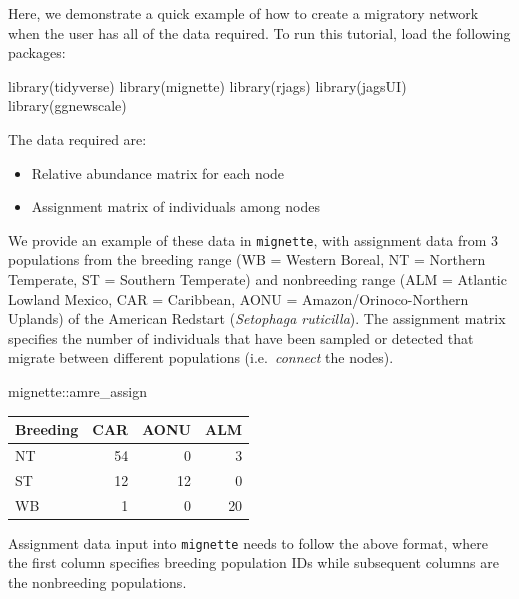 \documentclass[
]{book}
\newenvironment{Shaded}{\begin{snugshade}}{\end{snugshade}}
\newcommand{\FunctionTok}[1]{\textcolor[rgb]{0.00,0.00,0.00}{#1}}
\newcommand{\NormalTok}[1]{#1}
\newcommand{\SpecialCharTok}[1]{\textcolor[rgb]{0.00,0.00,0.00}{#1}}
\providecommand{\tightlist}{%
  \setlength{\itemsep}{0pt}\setlength{\parskip}{0pt}}
\begin{document}
Here, we demonstrate a quick example of how to create a migratory network when the user has all of the data required. To run this tutorial, load the following packages:

\begin{Shaded}
\begin{Highlighting}[]
\FunctionTok{library}\NormalTok{(tidyverse)}
\FunctionTok{library}\NormalTok{(mignette)}
\FunctionTok{library}\NormalTok{(rjags)}
\FunctionTok{library}\NormalTok{(jagsUI)}
\FunctionTok{library}\NormalTok{(ggnewscale)}
\end{Highlighting}
\end{Shaded}

The data required are:

\begin{itemize}
\tightlist
\item
  Relative abundance matrix for each node
\item
  Assignment matrix of individuals among nodes
\end{itemize}

We provide an example of these data in \texttt{mignette}, with assignment data from 3 populations from the breeding range (WB = Western Boreal, NT = Northern Temperate, ST = Southern Temperate) and nonbreeding range (ALM = Atlantic Lowland Mexico, CAR = Caribbean, AONU = Amazon/Orinoco-Northern Uplands) of the American Redstart (\emph{Setophaga ruticilla}). The assignment matrix specifies the number of individuals that have been sampled or detected that migrate between different populations (i.e.~\emph{connect} the nodes).

\begin{Shaded}
\begin{Highlighting}[]
\NormalTok{mignette}\SpecialCharTok{::}\NormalTok{amre\_assign}
\end{Highlighting}
\end{Shaded}

\begin{tabular}{l|r|r|r}
\hline
Breeding & CAR & AONU & ALM\\
\hline
NT & 54 & 0 & 3\\
\hline
ST & 12 & 12 & 0\\
\hline
WB & 1 & 0 & 20\\
\hline
\end{tabular}

Assignment data input into \texttt{mignette} needs to follow the above format, where the first column specifies breeding population IDs while subsequent columns are the nonbreeding populations.
\end{document}
